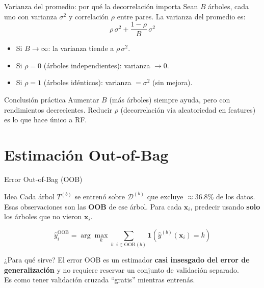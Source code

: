 \documentclass[aspectratio=169]{beamer}
\newcommand{\bx}{\bm{x}}
\begin{document}
\begin{frame}{Varianza del promedio: por qué la decorrelación importa}
  Sean $B$ árboles, cada uno con varianza $\sigma^2$ y correlación $\rho$ entre pares.
  La varianza del promedio es:
  \[
    \rho\,\sigma^2 + \frac{1-\rho}{B}\,\sigma^2
  \]

  \medskip
  \begin{itemize}
    \item Si $B \to \infty$: la varianza tiende a $\rho\,\sigma^2$.
    \item Si $\rho = 0$ (árboles independientes): varianza $\to 0$.
    \item Si $\rho = 1$ (árboles idénticos): varianza $= \sigma^2$ (sin mejora).
  \end{itemize}

  \medskip
  \begin{exampleblock}{Conclusión práctica}
    Aumentar $B$ (más árboles) siempre ayuda, pero con rendimientos decrecientes.
    Reducir $\rho$ (decorrelación vía aleatoriedad en features) es lo que hace único a RF.
  \end{exampleblock}
\end{frame}

\section{Estimación Out-of-Bag}

\begin{frame}{Error Out-of-Bag (OOB)}
  \begin{block}{Idea}
    Cada árbol $T^{(b)}$ se entrenó sobre $\mathcal{D}^{(b)}$ que excluye
    $\approx 36.8\%$ de los datos. Esas observaciones son las \textbf{OOB} de ese árbol.
    Para cada $\bx_i$, predecir usando \textbf{solo} los árboles que no vieron $\bx_i$.
  \end{block}

  \medskip
  \[
    \hat{y}_i^{\text{OOB}} = \arg\max_k \sum_{b:\, i \in \text{OOB}(b)} \mathbf{1}(\hat{y}^{(b)}(\bx_i) = k)
  \]

  \medskip
  \begin{exampleblock}{¿Para qué sirve?}
    El error OOB es un estimador \textbf{casi insesgado del error de generalización}
    y no requiere reservar un conjunto de validación separado.\\[4pt]
    Es como tener validación cruzada ``gratis'' mientras entrenás.
  \end{exampleblock}
\end{frame}
\end{document}
